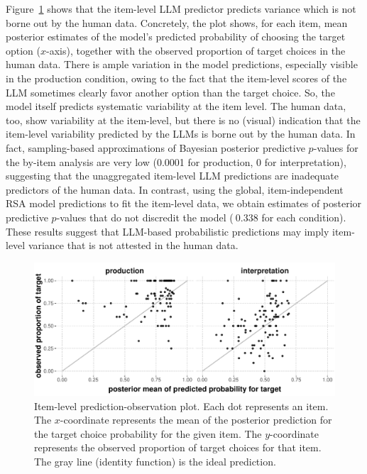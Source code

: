 \documentclass{article}
\begin{document}
Figure~\ref{fig:item-level-obs-pred} shows that the item-level LLM predictor predicts variance which is not borne out by the human data.
Concretely, the plot shows, for each item, mean posterior estimates of the model's predicted probability of choosing the target option ($x$-axis), together with the observed proportion of target choices in the human data.
There is ample variation in the model predictions, especially visible in the production condition, owing to the fact that the item-level scores of the LLM sometimes clearly favor another option than the target choice.
So, the model itself predicts systematic variability at the item level.
The human data, too, show variability at the item-level, but there is no (visual) indication that the item-level variability predicted by the LLMs is borne out by the human data.
In fact, sampling-based approximations of Bayesian posterior predictive $p$-values for the by-item analysis are very low (0.0001 for production, 0 for interpretation), suggesting that the unaggregated item-level LLM predictions are inadequate predictors of the human data.
In contrast, using the global, item-independent RSA model predictions to fit the item-level data, we obtain estimates of posterior predictive $p$-values that do not discredit the model ($~0.338$ for each condition).
These results suggest that LLM-based probabilistic predictions may imply item-level variance that is not attested in the human data.

\begin{figure}
  \centering

  \includegraphics[width = 0.9\linewidth]{00-pics/item-combined-obs-pred.pdf}

  \caption{
    Item-level prediction-observation plot.
    Each dot represents an item.
    The $x$-coordinate represents the mean of the posterior prediction for the target choice probability for the given item.
    The $y$-coordinate represents the observed proportion of target choices for that item.
    The gray line (identity function) is the ideal prediction.
  }
  \label{fig:item-level-obs-pred}
\end{figure}
\end{document}
